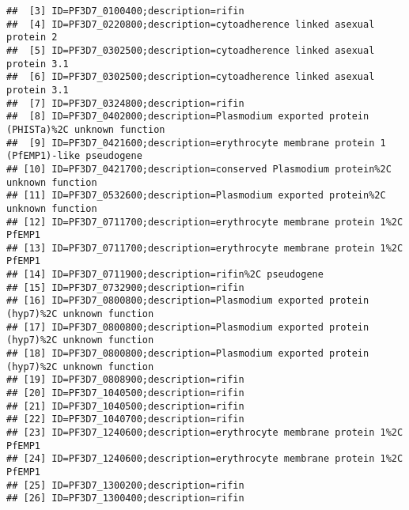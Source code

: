 \documentclass{article}\usepackage[]{graphicx}\usepackage[]{color}
\makeatletter
\newenvironment{kframe}{%
 \def\at@end@of@kframe{}%
 \ifinner\ifhmode%
  \def\at@end@of@kframe{\end{minipage}}%
  \begin{minipage}{\columnwidth}%
 \fi\fi%
 \def\FrameCommand##1{\hskip\@totalleftmargin \hskip-\fboxsep
 \colorbox{shadecolor}{##1}\hskip-\fboxsep
     \hskip-\linewidth \hskip-\@totalleftmargin \hskip\columnwidth}%
 \MakeFramed {\advance\hsize-\width
   \@totalleftmargin\z@ \linewidth\hsize
   \@setminipage}}%
 {\par\unskip\endMakeFramed%
 \at@end@of@kframe}
\newenvironment{knitrout}{}{} %
\makeatother
\begin{document}
\begin{knitrout}
\begin{kframe}
\begin{verbatim}
##  [3] ID=PF3D7_0100400;description=rifin                                                                      
##  [4] ID=PF3D7_0220800;description=cytoadherence linked asexual protein 2                                     
##  [5] ID=PF3D7_0302500;description=cytoadherence linked asexual protein 3.1                                   
##  [6] ID=PF3D7_0302500;description=cytoadherence linked asexual protein 3.1                                   
##  [7] ID=PF3D7_0324800;description=rifin                                                                      
##  [8] ID=PF3D7_0402000;description=Plasmodium exported protein (PHISTa)%2C unknown function                   
##  [9] ID=PF3D7_0421600;description=erythrocyte membrane protein 1 (PfEMP1)-like pseudogene                    
## [10] ID=PF3D7_0421700;description=conserved Plasmodium protein%2C unknown function                           
## [11] ID=PF3D7_0532600;description=Plasmodium exported protein%2C unknown function                            
## [12] ID=PF3D7_0711700;description=erythrocyte membrane protein 1%2C PfEMP1                                   
## [13] ID=PF3D7_0711700;description=erythrocyte membrane protein 1%2C PfEMP1                                   
## [14] ID=PF3D7_0711900;description=rifin%2C pseudogene                                                        
## [15] ID=PF3D7_0732900;description=rifin                                                                      
## [16] ID=PF3D7_0800800;description=Plasmodium exported protein (hyp7)%2C unknown function                     
## [17] ID=PF3D7_0800800;description=Plasmodium exported protein (hyp7)%2C unknown function                     
## [18] ID=PF3D7_0800800;description=Plasmodium exported protein (hyp7)%2C unknown function                     
## [19] ID=PF3D7_0808900;description=rifin                                                                      
## [20] ID=PF3D7_1040500;description=rifin                                                                      
## [21] ID=PF3D7_1040500;description=rifin                                                                      
## [22] ID=PF3D7_1040700;description=rifin                                                                      
## [23] ID=PF3D7_1240600;description=erythrocyte membrane protein 1%2C PfEMP1                                   
## [24] ID=PF3D7_1240600;description=erythrocyte membrane protein 1%2C PfEMP1                                   
## [25] ID=PF3D7_1300200;description=rifin                                                                      
## [26] ID=PF3D7_1300400;description=rifin                                                                      

\end{verbatim}
\end{kframe}
\end{knitrout}
\end{document}
